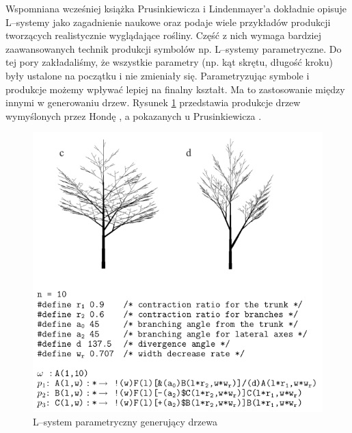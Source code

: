 \documentclass[inz,shortabstract]{iithesis}
\begin{document}
        Wspomniana wcześniej książka Prusinkiewicza i Lindenmayer'a \cite{plants} dokładnie opisuje L--systemy jako zagadnienie naukowe oraz podaje wiele przykładów produkcji tworzących realistycznie wyglądające rośliny. Część z nich wymaga bardziej zaawansowanych technik produkcji symbolów np. L--systemy parametryczne. Do tej pory zakładaliśmy, że wszystkie parametry (np. kąt skrętu, długość kroku) były ustalone na początku i nie zmieniały się. Parametryzując symbole i produkcje możemy wpływać lepiej na finalny kształt. Ma to zastosowanie między innymi w generowaniu drzew. Rysunek \ref{fig:hondaTrees} przedstawia produkcje drzew wymyślonych przez Hondę \cite{honda}, a pokazanych u Prusinkiewicza \cite{plants}.
        \begin{figure}[H]
            \includegraphics[width=\linewidth]{hondaTrees.png}
            \caption{L--system parametryczny generujący drzewa \cite{plants}\cite{honda}} 
            \label{fig:hondaTrees}
        \end{figure}
        
\end{document}
